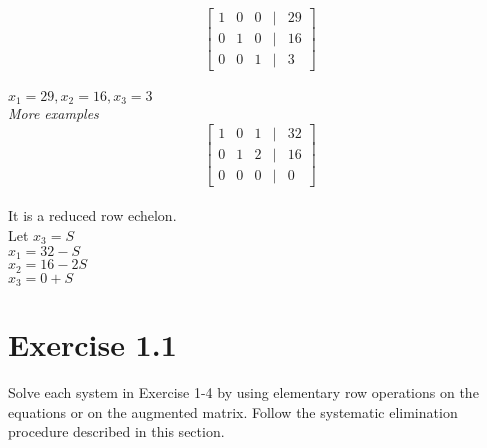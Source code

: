 \documentclass[]{article}
\begin{document}
\[
\begin{bmatrix}
	1 & 0 & 0 & | & 29 \\
	0 & 1 & 0 & | & 16 \\
	0 & 0 & 1 & | & 3
\end{bmatrix}
\]\\
$x_1 = 29 , x_2 = 16 , x_3 = 3$\\
\textsl{More examples}\\
\[
\begin{bmatrix}
	1 & 0 & 1 & | & 32 \\
	0 & 1 & 2 & | & 16 \\
	0 & 0 & 0 & | & 0
\end{bmatrix}
\]\\
It is a reduced row echelon.\\
Let $x_3 = S$\\
$x_1 = 32 - S$\\
$x_2 = 16 - 2S$\\
$x_3 = 0 + S$\\

\section{Exercise 1.1}
Solve each system in Exercise 1-4 by using elementary row operations on the equations or on the augmented matrix. Follow the systematic elimination procedure described in this section.\\
\end{document}

